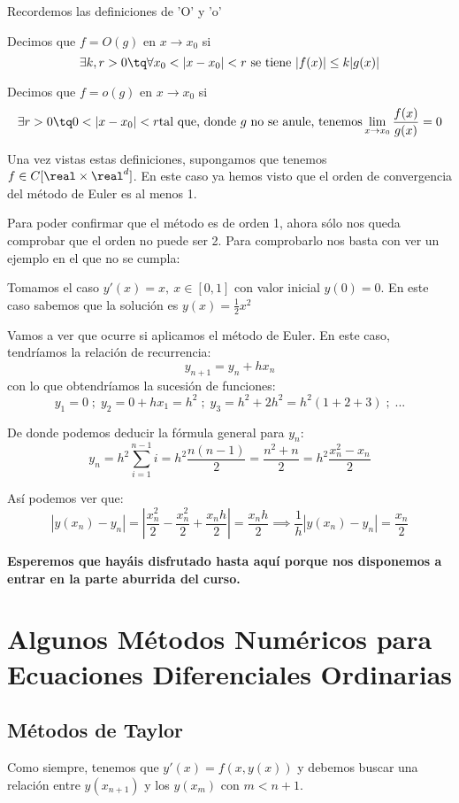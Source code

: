 \documentclass{apuntes}
\begin{document}
Recordemos las definiciones de 'O' y 'o'

\begin{defn}[O grande]
Decimos que $f= O(g)$ en $x \to x_0$ si
\[\exists k,r > 0 \tq \forall x_0 < |x-x_0|< r \text{ se tiene } |f(x)| \leq k |g(x)|\]
\end{defn}

\begin{defn}[O pequeña]
Decimos que $f=o(g)$ en $x \to x_0$ si
\[\exists r > 0 \tq 0 < |x-x_0|<r \text{tal que, donde } g \text{ no se anule, tenemos} \lim_{x\to x_0} \frac{f(x)}{g(x)}=0\]
\end{defn}

Una vez vistas estas definiciones, supongamos que tenemos $f \in C [\real \times \real^d]$. En este caso ya hemos visto que el orden de convergencia del método de Euler es al menos 1.

Para poder confirmar que el método es de orden 1, ahora sólo nos queda comprobar que el orden no puede ser 2. Para comprobarlo nos basta con ver un ejemplo en el que no se cumpla:
\begin{example}
Tomamos el caso $y'(x)=x, \ x \in [0,1]$ con valor inicial $y(0)=0$. En este caso sabemos que la solución es $y(x)=\frac{1}{2}x^2$

Vamos a ver que ocurre si aplicamos el método de Euler. En este caso, tendríamos la relación de recurrencia:
\[y_{n+1} = y_n + h x_n\]
con lo que obtendríamos la sucesión de funciones:
\[y_1 = 0 \; ; \; y_2 = 0 + hx_1 =h^2 \; ; \; y_3 = h^2+2h^2=h^2(1+2+3) \; ; \; ...\]

De donde podemos deducir la fórmula general para $y_n$:
\[y_n = h^2\sum_{i=1}^{n-1} i = h^2\frac{n(n-1)}{2}=\frac{n^2+n}{2} =h^2\frac{x_n^2-x_n}{2}\]

Así podemos ver que:
\[|y(x_n)-y_n| = \left|\frac{x_n^2}{2}-\frac{x_n^2}{2}+\frac{x_nh}{2} \right| = \frac{x_nh}{2} \implies \frac{1}{h}|y(x_n)-y_n|  = \frac{x_n}{2}\]
\end{example}


\textbf{Esperemos que hayáis disfrutado hasta aquí porque nos disponemos a entrar en la parte aburrida del curso.}


\chapter{Algunos Métodos Numéricos para Ecuaciones Diferenciales Ordinarias}
\section{Métodos de Taylor}
Como siempre, tenemos que $y'(x)=f(x,y(x))$ y debemos buscar una relación entre $y(x_{n+1})$ y los $y(x_m)$ con $m < n+1$.
\end{document}
